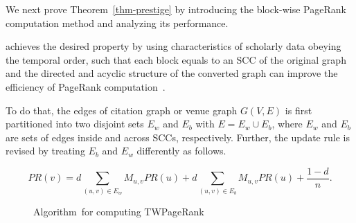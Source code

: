 We next prove Theorem~\ref{thm-prestige} by introducing the block-wise PageRank computation method and analyzing its performance. 

achieves the desired property by using characteristics of scholarly data obeying the temporal order, such that each block equals to an SCC of the original graph and the directed and acyclic structure of the converted graph can improve the efficiency of PageRank computation~\cite{Berkhin05}.

To do that, the edges of citation graph or venue graph $G(V, E)$ is first partitioned into two disjoint sets $E_w$ and $E_b$ with $E=E_w \cup E_b$, where $E_w$ and $E_b$ are sets of edges inside and across SCCs, respectively. Further, the update rule is revised by treating $E_b$ and $E_w$ differently as follows.
\begin{small}
\begin{equation}\label{eq-prscc}
PR(v) =  d \sum_{(u,v)\in E_w} M_{u,v} PR(u)
  + d \sum_{(u,v)\in E_b} M_{u,v} PR(u) +  \frac{1-d}{n}.
\end{equation}
\end{small}



\begin{figure}[tb!]
\begin{center}
{\small
\begin{minipage}{3.36in}
\myhrule \vspace{-1.5ex}
\vspace{-2.5ex} \myhrule
\end{minipage}
}
\end{center}
\vspace{-3ex}
\caption{\small Algorithm~\twprscc for computing TWPageRank} \label{alg-TWPageRank-venue}
\vspace{-3ex}
\end{figure}

